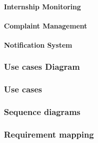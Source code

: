 \paragraph{Internship Monitoring}

\paragraph{Complaint Management}

\paragraph{Notification System}


\subsubsection{Use cases Diagram}
\subsubsection{Use cases}
\subsubsection{Sequence diagrams}
\subsubsection{Requirement mapping}
